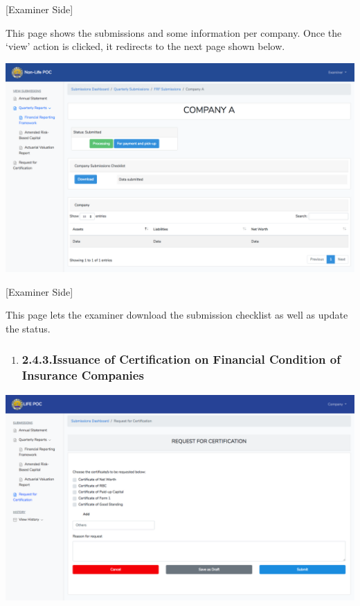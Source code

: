 \documentclass{article}
\begin{document}
[Examiner Side]%

This page shows the submissions and some information
per company. Once the ‘view’ action is clicked, it redirects to the next
page shown below.%

\includegraphics[keepaspectratio=true]{up-ic-screens/image171}{}%

[Examiner Side]%

This page lets the examiner download the submission
checklist as well as update the status.%

\begin{enumerate}[noitemsep,topsep=\mdcompacttopsep]%

\item{}
\subsubsection{2.4.3.\hspace*{0.5em}Issuance of Certification on Financial Condition of Insurance Companies}\label{sec-issuance-of-certification-on-financial-condition-of-insurance-companies}%
\end{enumerate}%

\noindent{}\includegraphics[keepaspectratio=true]{up-ic-screens/image213}{}%
\end{document}
